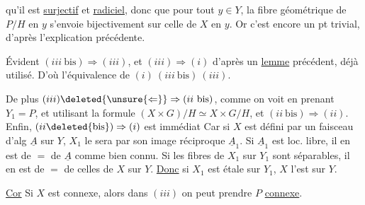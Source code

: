 qu'il est \uline{surjectif} et \uline{radiciel}, donc que pour tout $y\in Y$, la fibre géométrique de $P/H$  en $y$ s'envoie bijectivement sur celle de $X$ en $y$.
Or c'est encore un pt trivial, d'après l'explication précédente.


Évident $(iii\ \mathrm{bis})\Rightarrow(iii)$, et $(iii)\Rightarrow(i)$ d'après un \uline{lemme} précédent, déjà utilisé.
D'où l'équivalence de $(i)\ (iii\ \mathrm{bis})\ (iii)$.

De plus $(iii)\deleted{\unsure{\Leftarrow}}\Rightarrow(ii\ \mathrm{bis})$, comme on voit en prenant $Y_1=P$, et utilisant la formule
$(X\times G)/H\simeq X\times G/H$, et $(ii\ \mathrm{bis})\Rightarrow(ii)$.
Enfin, $(ii\deleted{\mathrm{bis}})\Rightarrow(i)$ est immédiat
\deleted{[car la condition \unsure{loc.}}
Car si $X$ est défini par un faisceau d'alg $\underline A$ sur $Y$, $X_1$ le sera par son image réciproque $\underline A_1$.
Si $\underline A_1$ est loc. libre, il en est de $=$ de $\underline A$ comme bien connu.
Si les fibres de $X_1$ sur $Y_1$ sont séparables,  il en est de $=$ de celles de $X$ sur $Y$.
\uline{Donc} si $X_1$ est étale sur $Y_1$, $X$ l'est sur $Y$.

\uline{Cor}
Si $X$ est connexe, alors dans $(iii)$ on peut prendre $P$ \uline{connexe}.
